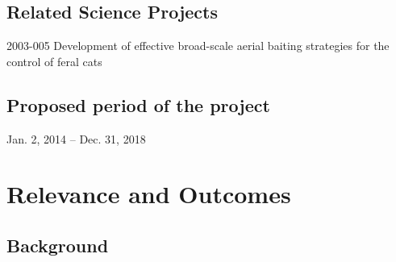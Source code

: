 \documentclass[version=last,
    paper=a4,                               %
    10pt,                                   %
    dvipsnames,
    oneside,                              %
    headings=openany,                       %
    open=any,
    BCOR=7mm,                               %
    DIV=15,     %
]{scrbook}
\begin{document}
\subsection*{Related Science Projects}

2003-005 Development of effective broad-scale aerial baiting strategies
for the control of feral cats


\subsection*{Proposed period of the project}
Jan. 2, 2014 -- Dec. 31, 2018



\section*{Relevance and Outcomes}


\subsection*{Background}
\end{document}

